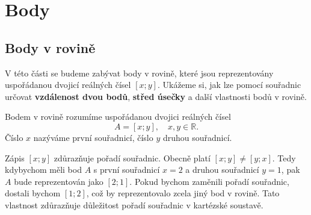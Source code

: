 \section{Body}\label{sec:Points}
\subsection{Body v rovině}\label{subsec:Points_in_plane}

V této části se budeme zabývat body v rovině, které jsou reprezentovány uspořádanou dvojicí reálných čísel $[x;y]$.
Ukážeme si, jak lze pomocí souřadnic určovat \textbf{vzdálenost dvou bodů}, \textbf{střed úsečky} a další vlastnosti bodů v rovině.


\begin{definition}\label{def:bod_v_rovině}
    Bodem v rovině rozumíme uspořádanou dvojici reálných čísel
    \[
    A = [x;y], \quad x,y \in \mathbb{R}.
    \]
    Číslo $x$ nazýváme první souřadnicí, číslo $y$ druhou souřadnicí.
\end{definition}

\begin{remark}
    Zápis $[x;y]$ zdůrazňuje pořadí souřadnic. Obecně platí $[x;y] \neq [y;x]$. Tedy kdybychom měli bod $A$ s první souřadnicí $x=2$ a druhou souřadnicí $y=1$, pak $A$ bude reprezentován jako $[2;1]$.
    Pokud bychom zaměnili pořadí souřadnic, dostali bychom $[1;2]$, což by reprezentovalo zcela jiný bod v rovině. Tato vlastnost zdůrazňuje důležitost pořadí souřadnic v kartézské soustavě.
\end{remark} 

